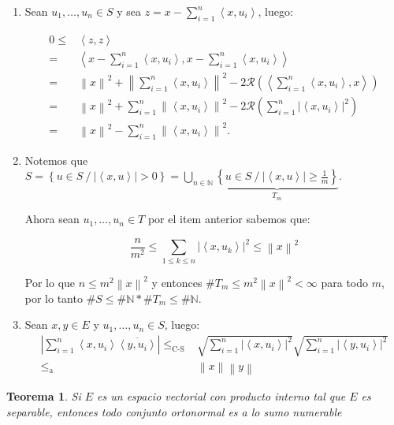 \documentclass[11pt]{article}
\newcommand{\N}{{\mathbb{N}}}
\newcommand{\norm}[1]{\left\lVert#1\right\rVert}
\newcommand{\abs}[1]{\left\lvert#1\right\rvert}
\newcommand{\ip}[1]{\left\langle#1\right\rangle}
\newcommand{\sett}[1]{\left\lbrace#1\right\rbrace}
\newcommand{\Bigcup}[2]{\bigcup\limits_{#1}{#2}}
\newcommand{\Bigsum}[2]{\sum\limits_{#1}{#2}}
\newtheorem{theorem}{Teorema}
\numberwithin{theorem}{subsection}
\newenvironment{proof}[1][Demostraci\'on]{\begin{trivlist}
		\item[\hskip \labelsep {\bfseries #1}]}{\end{trivlist}}
\newcommand{\qed}{\nobreak \ifvmode \relax \else
	\ifdim\lastskip<1.5em \hskip-\lastskip
	\hskip1.5em plus0em minus0.5em \fi \nobreak
	\vrule height0.75em width0.5em depth0.25em\fi}
\begin{document}
\begin{proof}
	\begin{enumerate}
		\item Sean $u_1,\dots,u_n \in S$ y sea $z = x - \sum\limits_{i = 1}^{n}{{\ip{x,u_i}}}$, luego:
	
	\[
	\begin{aligned}
		0 \leq & \ip{z,z} \\
		= & \ip{x - \sum\limits_{i = 1}^{n}{\ip{x,u_i}},x - \sum\limits_{i = 1}^{n}{\ip{x,u_i}}} \\
		= & \norm{x}^2 + \norm{\sum\limits_{i = 1}^{n}{\ip{x,u_i}}}^2 - 2 \mathcal{R} \left(\ip{\sum\limits_{i = 1}^{n}{\ip{x,u_i}},x}\right) \\
		= & \norm{x}^2 + \sum\limits_{i = 1}^{n}{\norm{\ip{x,u_i}}^2} - 2 \mathcal{R} \left(\sum\limits_{i = 1}^{n}{\abs{\ip{x,u_i}}^2}\right) \\
		= & \norm{x}^2 - \sum\limits_{i = 1}^{n}{\norm{\ip{x,u_i}}^2}.
	\end{aligned}
	\]
	
	\item Notemos que $S = \sett{u \in S \ / \ \abs{\ip{x,u}} > 0} = \Bigcup{n \in \N}{\underbrace{\sett{u \in S \ / \ \abs{\ip{x,u}} \geq \frac{1}{m} }}_{T_m}}$.
	
	Ahora sean $u_1,\dots,u_n \in T$ por el item anterior sabemos que:
	
	\[
		\frac{n}{m^2} \leq \Bigsum{1 \leq k \leq n}{\abs{\ip{x,u_k}}^2} \leq \norm{x}^2
	\]
	
	Por lo que $n \leq m^2 \norm{x}^2$ y entonces $\# T_m \leq m^2 \norm{x}^2 < \infty$ para todo $m$, por lo tanto $\# S \leq \# \N * \# T_m \leq \# \N$.
	
	\item Sean $x,y \in E$ y $u_1,\dots,u_n \in S$, luego:
	\[
	 \begin{aligned}
	 	 \abs{\sum\limits_{i = 1}^{n}{\ip{x,u_i}\overline{\ip{y,u_i}}}} \leq_\text{C-S} & \sqrt{ \sum\limits_{i = 1}^{n}{\abs{\ip{x,u_i}}^2}}\sqrt{ \sum\limits_{i = 1}^{n}{\abs{\ip{y,u_i}}^2}} \\
	 	 \leq_\text{a} & \norm{x}\norm{y}
	 \end{aligned}
	\]
	\qed
	\end{enumerate}
\end{proof}

\begin{theorem}
	\label{Todo conjunto ortonormal en un separable es numerable}
	Si $E$ es un espacio vectorial con producto interno tal que $E$ es separable, entonces todo conjunto ortonormal es a lo sumo numerable
\end{theorem}
\end{document}
